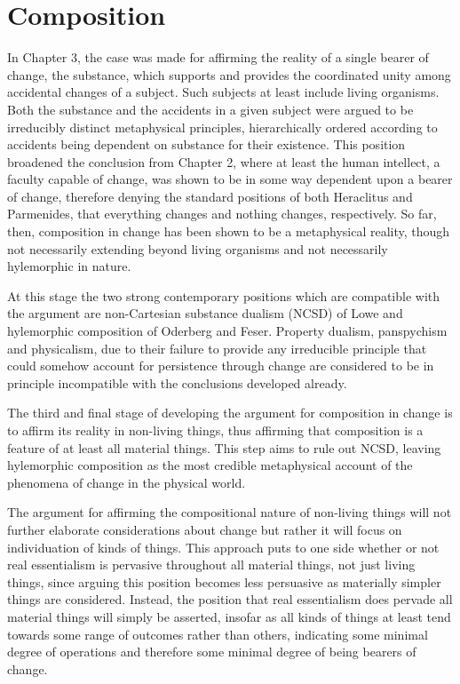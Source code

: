 \chapter{Composition}
\label{ch:composition}

In Chapter 3, the case was made for affirming the reality of a single bearer of change, the substance, which supports and provides the coordinated unity among accidental changes of a subject. Such subjects at least include living organisms. Both the substance and the accidents in a given subject were argued to be irreducibly distinct metaphysical principles, hierarchically ordered according to accidents being dependent on substance for their existence. This position broadened the conclusion from Chapter 2, where at least the human intellect, a faculty capable of change, was shown to be in some way dependent upon a bearer of change, therefore denying the standard positions of both Heraclitus and Parmenides, that everything changes and nothing changes, respectively. So far, then, composition in change has been shown to be a metaphysical reality, though not necessarily extending beyond living organisms and not necessarily hylemorphic in nature.

At this stage the two strong contemporary positions which are compatible with the argument are non-Cartesian substance dualism (NCSD) of Lowe and hylemorphic composition of Oderberg and Feser. Property dualism, panspychism and physicalism, due to their failure to provide any irreducible principle that could somehow account for persistence through change are considered to be in principle incompatible with the conclusions developed already.

The third and final stage of developing the argument for composition in change is to affirm its reality in non-living things, thus affirming that composition is a feature of at least all material things. This step aims to rule out NCSD, leaving hylemorphic composition as the most credible metaphysical account of the phenomena of change in the physical world.

The argument for affirming the compositional nature of non-living things will not further elaborate considerations about change but rather it will focus on individuation of kinds of things. This approach puts to one side whether or not real essentialism is pervasive throughout all material things, not just living things, since arguing this position becomes less persuasive as materially simpler things are considered. Instead, the position that real essentialism does pervade all material things will simply be asserted, insofar as all kinds of things at least tend towards some range of outcomes rather than others, indicating some minimal degree of operations and therefore some minimal degree of being bearers of change.

